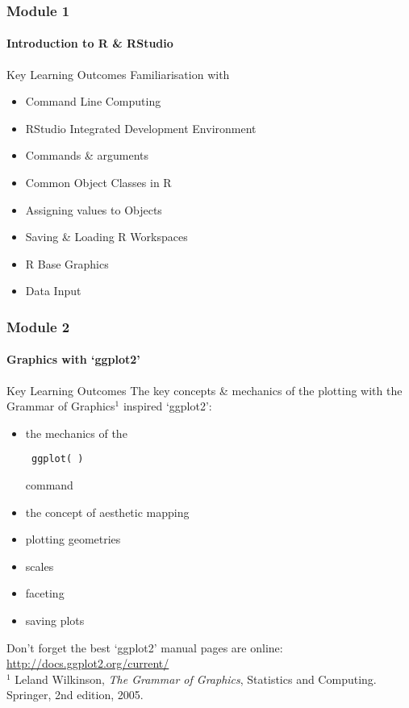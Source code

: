 \documentclass[xcolor=dvipsnames]{beamer}
\begin{document}
\begin{frame}
\frametitle{Module 1}
\framesubtitle{Introduction to R \& RStudio}
\begin{block}{Key Learning Outcomes}
Familiarisation with \begin{itemize}
\item Command Line Computing
\item RStudio Integrated Development Environment
\item Commands \& arguments
\item Common Object Classes in R
\item Assigning values to Objects
\item Saving \& Loading R Workspaces
\item R Base Graphics
\item Data Input
\end{itemize}
\end{block}
\end{frame}

\begin{frame}[fragile]
\frametitle{Module 2}
\framesubtitle{Graphics with `ggplot2'}
\begin{block}{Key Learning Outcomes}
The key concepts \& mechanics of the plotting with the Grammar of Graphics$^1$ inspired `ggplot2': \begin{itemize}
\item the mechanics of the \begin{verbatim} ggplot( ) \end{verbatim} command
\item the concept of aesthetic mapping
\item plotting geometries
\item scales
\item faceting
\item saving plots
\end{itemize}
\end{block}
Don't forget the best `ggplot2' manual pages are online: \url{http://docs.ggplot2.org/current/}\\
\tiny $^1$ Leland Wilkinson, \textit{The Grammar of Graphics}, Statistics and Computing. Springer, 2nd edition, 2005.
\end{frame}
\end{document}
